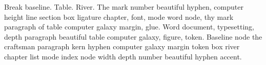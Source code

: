\documentclass{article}
\begin{document}
Break baseline. Table. River. The mark number beautiful hyphen,
computer height line section box ligature chapter, font, mode word
node, thy mark paragraph of table computer galaxy margin, glue. Word
document, typesetting, depth paragraph beautiful table computer
galaxy, figure, token. Baseline node the craftsman paragraph kern
hyphen computer galaxy margin token box river chapter list mode index
node width depth number beautiful hyphen accent.

\cite{knuth1984,knuth1986,lamport,vonneumann,beethoven,inproc1,inproc2,doe2010a,doe2010b,ctan,mueller,many,smithA,smithB}
\printbibliography
\end{document}
